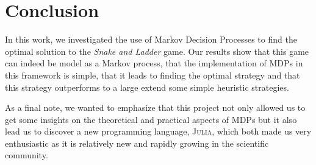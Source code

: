\section{Conclusion} %
\label{sec:conclusion}
In this work, we investigated the use of Markov Decision Processes
to find the optimal solution to the \textit{Snake and Ladder} game. 
Our results show that this game can indeed be model as a Markov process, 
that the implementation of MDPs in this framework is simple,
that it leads to finding the optimal strategy and that this strategy
outperforms to a large extend some simple heuristic strategies. 

As a final note, we wanted to
emphasize that this project not only allowed us to get some
insights on the theoretical and practical aspects of MDPs
but it also lead us to discover a new programming language, \textsc{Julia},
which both made us very enthusiastic as it is relatively new
and rapidly growing in the scientific community.
